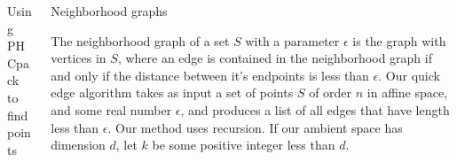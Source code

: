\documentclass{beamer}
\begin{document}
\begin{frame}{}
\begin{columns}[t]
\begin{column}{0.32\linewidth}
\begin{block}{Using PHCpack to find points}

\end{block}


\end{column}%

\begin{column}{0.32\linewidth}




\begin{block}{Neighborhood graphs}

\justify
The neighborhood graph of a set $S$ with a parameter $\epsilon$ is the graph with vertices in $S$, where an edge is contained in the neighborhood graph if and only if the distance between it's endpoints is less than $\epsilon$. Our quick edge algorithm takes as input a set of points $S$ of order $n$ in affine space, and some real number $\epsilon$, and produces a list of all edges that have length less than $\epsilon$. Our method uses recursion. If our ambient space has dimension $d$, let $k$ be some positive integer less than $d$. 
\\


\end{block}
\end{column}
\end{columns}
\end{frame}
\end{document}
